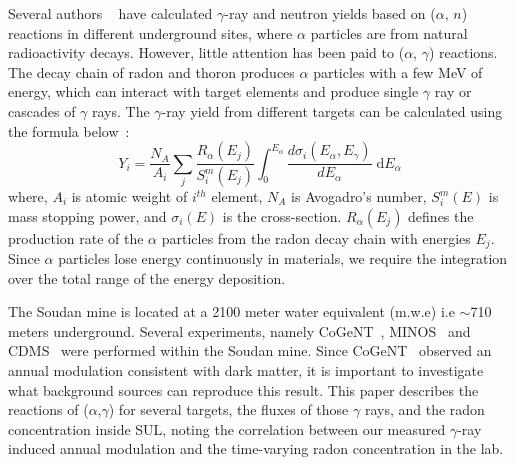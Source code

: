 \documentclass[aps,prc,showpacs,twocolumn,superscriptaddress]{revtex4-1}
\begin{document}
Several authors ~\cite{mei,heaton1} have calculated $\gamma$-ray and neutron yields based on ($\alpha$, $n$) reactions in different underground sites, where $\alpha$ particles are from natural radioactivity decays. However, little attention has been paid to ($\alpha$, $\gamma$) reactions. The decay chain of radon and thoron produces $\alpha$ particles with a few MeV of energy, which can interact with target elements and produce single $\gamma$ ray or cascades of $\gamma$ rays. The $\gamma$-ray yield from different targets can be calculated using the formula below~\cite{mei,feige,heaton2}: 
\begin{equation}
Y_{i} = \frac{N_{A}}{A_{i}} \sum_{j} \frac{R_{\alpha}(E_{j})}{S_{i}^m{(E_{j})}} \int_0^{E_{\alpha}} \frac{d\sigma_{i}{(E_{\alpha},E_{\gamma})}}{dE_{\alpha}}\;\mathrm{d}E_{\alpha}
\label{eq:gammayield}
\end{equation}
where, $A_{i}$ is atomic weight of $i^{th}$ element, $N_{A}$ is Avogadro's number, $S_{i}^m{(E)}$ is mass stopping power, and $\sigma_{i}{(E)}$ is the cross-section. $R_{\alpha}(E_{j})$ defines the production rate of the $\alpha$ particles from the radon decay chain with energies $E_{j}$. Since $\alpha$ particles lose energy continuously in materials, we require the integration over the total range of the energy deposition.

The Soudan mine is located at a 2100 meter water equivalent (m.w.e) i.e $\sim$710 meters underground. Several experiments, namely CoGeNT~\cite{cogent}, MINOS~\cite{minos} and CDMS~\cite{cdms} were performed within the Soudan mine. Since CoGeNT~\cite{cogent2} observed an annual modulation consistent with dark matter, it is important to investigate what background sources can reproduce this result. This paper describes the reactions of ($\alpha$,$\gamma$) for several targets, the fluxes of those $\gamma$ rays, and the radon concentration inside SUL, noting the correlation between our measured $\gamma$-ray induced annual modulation and the time-varying radon concentration in the lab.
 
\end{document}
